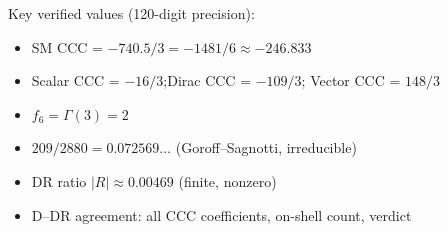 \documentclass[11pt,a4paper]{article}
\begin{document}
\noindent Key verified values (120-digit precision):
\begin{itemize}
  \item SM CCC = $-740.5/3 = -1481/6 \approx -246.833$
  \item Scalar CCC = $-16/3$;\quad Dirac CCC = $-109/3$;\quad
    Vector CCC = $148/3$
  \item $f_6 = \Gamma(3) = 2$
  \item $209/2880 = 0.072569\ldots$ (Goroff--Sagnotti, irreducible)
  \item DR ratio $|R| \approx 0.00469$ (finite, nonzero)
  \item D--DR agreement: all CCC coefficients, on-shell count, verdict
\end{itemize}


\end{document}
